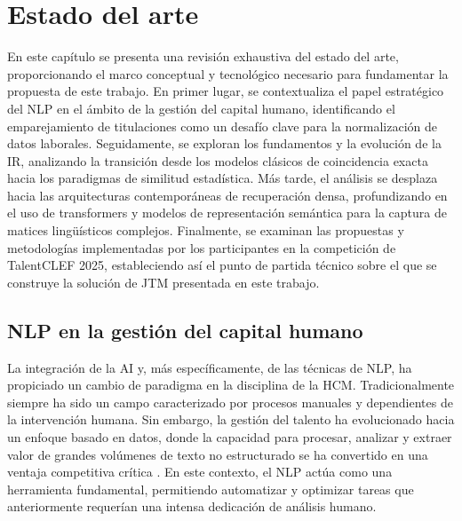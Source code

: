 
\chapter{Estado del arte}
\label{ch:EstadoArte}

\noindent En este capítulo se presenta una revisión exhaustiva del estado del arte, proporcionando el marco conceptual y tecnológico necesario para fundamentar la propuesta de este trabajo. En primer lugar, se contextualiza el papel estratégico del \gls{NLP} en el ámbito de la gestión del capital humano, identificando el emparejamiento de titulaciones como un desafío clave para la normalización de datos laborales. Seguidamente, se exploran los fundamentos y la evolución de la \gls{IR}, analizando la transición desde los modelos clásicos de coincidencia exacta hacia los paradigmas de similitud estadística. Más tarde, el análisis se desplaza hacia las arquitecturas contemporáneas de recuperación densa, profundizando en el uso de transformers y modelos de representación semántica para la captura de matices lingüísticos complejos. Finalmente, se examinan las propuestas y metodologías implementadas por los participantes en la competición de TalentCLEF 2025, estableciendo así el punto de partida técnico sobre el que se construye la solución de \gls{JTM} presentada en este trabajo.

\section{NLP en la gestión del capital humano}
\label{sec:NLPinHCM}

\noindent La integración de la \gls{AI} y, más específicamente, de las técnicas de \gls{NLP}, ha propiciado un cambio de paradigma en la disciplina de la \gls{HCM}. Tradicionalmente siempre ha sido un campo caracterizado por procesos manuales y dependientes de la intervención humana. Sin embargo, la gestión del talento ha evolucionado hacia un enfoque basado en datos, donde la capacidad para procesar, analizar y extraer valor de grandes volúmenes de texto no estructurado se ha convertido en una ventaja competitiva crítica \cite{maslej2025artificial}. En este contexto, el \gls{NLP} actúa como una herramienta fundamental, permitiendo automatizar y optimizar tareas que anteriormente requerían una intensa dedicación de análisis humano.

